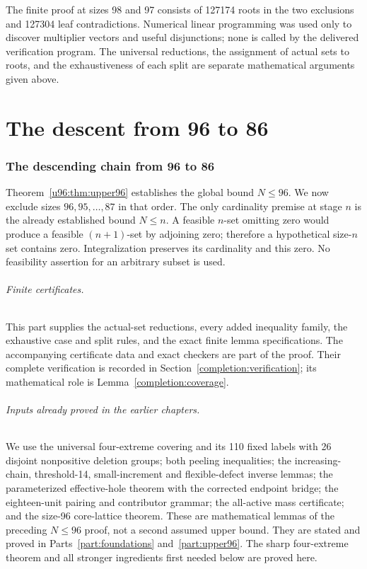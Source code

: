 \documentclass[11pt,a4paper]{article}
\theoremstyle{remark}
\begin{document}
The finite proof at sizes 98 and 97 consists of 127174 roots in the two exclusions and
127304 leaf contradictions. Numerical linear programming was used only
to discover multiplier vectors and useful disjunctions; none is called
by the delivered verification program. The universal reductions, the
assignment of actual sets to roots, and the exhaustiveness of each split
are separate mathematical arguments given above. 



\clearpage\part{The descent from 96 to 86}\label{part:upper86}

\section{The descending chain from 96 to 86}
\label{u86:sec:entry}
Theorem~\ref{u96:thm:upper96} establishes the global bound $N\le96$. We now exclude
sizes $96,95,\ldots,87$ in that order. The only cardinality premise at
stage $n$ is the already established bound $N\le n$. A feasible $n$-set
omitting zero would produce a feasible $(n+1)$-set by adjoining zero;
therefore a hypothetical size-$n$ set contains zero. Integralization
preserves its cardinality and this zero. No feasibility assertion for an
arbitrary subset is used.

\paragraph{Finite certificates.}
This part supplies the actual-set reductions, every added inequality
family, the exhaustive case and split rules, and the exact finite lemma
specifications. The accompanying certificate data and exact checkers are
part of the proof. Their complete verification is recorded in
Section~\ref{completion:verification}; its mathematical role is
Lemma~\ref{completion:coverage}.

\paragraph{Inputs already proved in the earlier chapters.}
We use the universal four-extreme covering and its 110 fixed labels with
26 disjoint nonpositive deletion groups; both peeling inequalities; the
increasing-chain, threshold-14, small-increment and flexible-defect inverse
lemmas; the parameterized effective-hole theorem with the corrected
endpoint bridge; the eighteen-unit pairing and contributor grammar; the
all-active mass certificate; and the size-96 core-lattice theorem.
These are mathematical lemmas of the preceding $N\le96$ proof, not a
second assumed upper bound. They are stated and proved in Parts~\ref{part:foundations} and~\ref{part:upper96}. The sharp four-extreme theorem
and all stronger ingredients first needed below are proved here.
\end{document}

